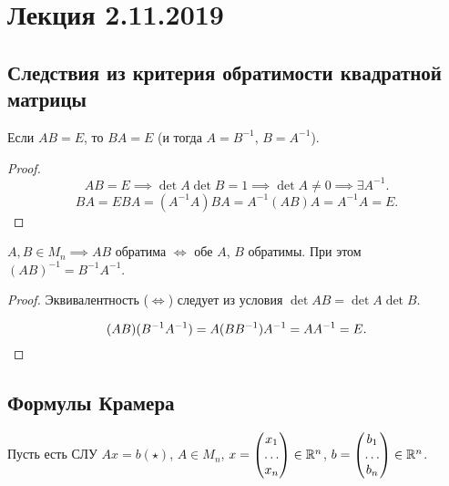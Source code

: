 \section{Лекция 2.11.2019}


\subsection{Следствия из критерия обратимости квадратной матрицы}

\begin{corollary}
    Если $AB = E$, то $BA = E$ (и тогда $A = B^{-1}$, $B = A^{-1}$).
\end{corollary}

\begin{proof}
    \label{proof:ab_inverse}
    \begin{equation*}
        AB = E \implies \det A \det B = 1 \implies \det A \neq 0 \implies \exists A^{-1}
    .\end{equation*}
    \begin{equation*}
        BA = EBA = (A^{-1}A)BA = A^{-1}(AB)A = A^{-1}A = E
    .\end{equation*}
\end{proof}

\begin{corollary}
    $A, B \in M_n \implies AB$ обратима $\iff$ обе $A$, $B$ обратимы. При этом $(AB)^{-1} = B^{-1} A^{-1}$.
\end{corollary}

\begin{proof}
    Эквивалентность ($\iff$) следует из условия $\det AB = \det A \det B$.

    \begin{equation*}
        (AB)(B^{-1}A^{-1}) = A(BB^{-1})A^{-1} = A A^{-1} = E
    .\qedhere\end{equation*}
\end{proof}

\subsection{Формулы Крамера}

Пусть есть СЛУ $Ax = b (\star)$, $A \in M_n$, $x = \begin{pmatrix} x_1 \\ \dots \\ x_n \end{pmatrix} \in \mathbb{R}^n$, $b = \begin{pmatrix} b_1 \\ \dots \\ b_n \end{pmatrix} \in \mathbb{R}^n$.

